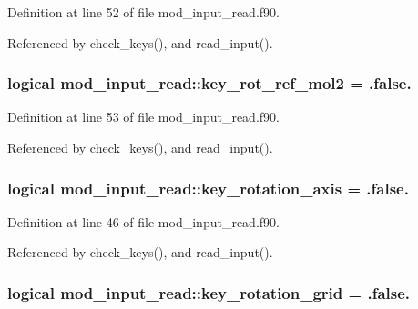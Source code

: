 Definition at line 52 of file mod\+\_\+input\+\_\+read.\+f90.



Referenced by check\+\_\+keys(), and read\+\_\+input().

\subsubsection[{\texorpdfstring{key\+\_\+rot\+\_\+ref\+\_\+mol2}{key_rot_ref_mol2}}]{\setlength{\rightskip}{0pt plus 5cm}logical mod\+\_\+input\+\_\+read\+::key\+\_\+rot\+\_\+ref\+\_\+mol2 = .false.}\hypertarget{namespacemod__input__read_abf16c25db5c3926452c89143c7548df7}{}\label{namespacemod__input__read_abf16c25db5c3926452c89143c7548df7}


Definition at line 53 of file mod\+\_\+input\+\_\+read.\+f90.



Referenced by check\+\_\+keys(), and read\+\_\+input().

\subsubsection[{\texorpdfstring{key\+\_\+rotation\+\_\+axis}{key_rotation_axis}}]{\setlength{\rightskip}{0pt plus 5cm}logical mod\+\_\+input\+\_\+read\+::key\+\_\+rotation\+\_\+axis = .false.}\hypertarget{namespacemod__input__read_a72d79af87249c49e917e16ed9978d242}{}\label{namespacemod__input__read_a72d79af87249c49e917e16ed9978d242}


Definition at line 46 of file mod\+\_\+input\+\_\+read.\+f90.



Referenced by check\+\_\+keys(), and read\+\_\+input().

\subsubsection[{\texorpdfstring{key\+\_\+rotation\+\_\+grid}{key_rotation_grid}}]{\setlength{\rightskip}{0pt plus 5cm}logical mod\+\_\+input\+\_\+read\+::key\+\_\+rotation\+\_\+grid = .false.}\hypertarget{namespacemod__input__read_a3a5a0477db778e79dd96be267f9ebde5}{}\label{namespacemod__input__read_a3a5a0477db778e79dd96be267f9ebde5}


